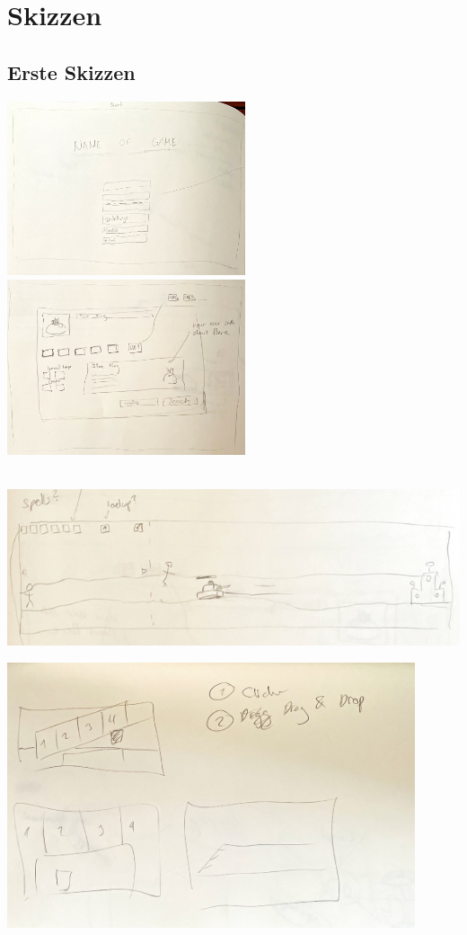 \chapter{Skizzen}

\section{Erste Skizzen}

\includegraphics*[width=7cm]{resources/SK_startpage.png} \quad \includegraphics*[width=7cm]{resources/SK_auswahl.png}\\
\\
\begin{center}
    \includegraphics*[width=14.5cm]{resources/sk_gamemain.png}\\
\end{center}

\begin{center}
    \includegraphics*[width=12cm]{resources/sk_dragndrop.png}
\end{center}


